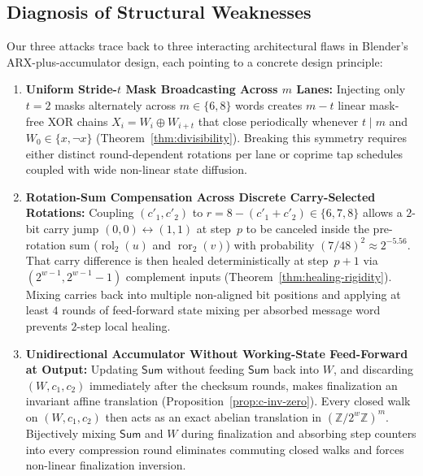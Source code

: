 \documentclass[11pt,a4paper]{article}
\theoremstyle{definition}
\theoremstyle{remark}
\newcommand{\Zmod}[1]{\mathbb{Z}/2^{#1}\mathbb{Z}}
\newcommand{\ror}{\operatorname{ror}}
\newcommand{\rol}{\operatorname{rol}}
\newcommand{\SumAcc}{\mathsf{Sum}}
\begin{document}
\subsection{Diagnosis of Structural Weaknesses}
\label{subsec:diagnosis}
Our three attacks trace back to three interacting architectural flaws in Blender's ARX-plus-accumulator design, each pointing to a concrete design principle:
\begin{enumerate}[leftmargin=2em]
    \item \textbf{Uniform Stride-$t$ Mask Broadcasting Across $m$ Lanes:} Injecting only $t = 2$ masks alternately across $m \in \{6, 8\}$ words creates $m - t$ linear mask-free XOR chains $X_i = W_i \oplus W_{i+t}$ that close periodically whenever $t \mid m$ and $W_0 \in \{x, \neg x\}$ (Theorem~\ref{thm:divisibility}). Breaking this symmetry requires either distinct round-dependent rotations per lane or coprime tap schedules coupled with wide non-linear state diffusion.
    \item \textbf{Rotation-Sum Compensation Across Discrete Carry-Selected Rotations:} Coupling $(c'_1, c'_2)$ to $r = 8 - (c'_1 + c'_2) \in \{6, 7, 8\}$ allows a $2$-bit carry jump $(0,0) \leftrightarrow (1,1)$ at step~$p$ to be canceled inside the pre-rotation sum ($\rol_2(u)$ and $\ror_2(v)$) with probability $(7/48)^2 \approx 2^{-5.56}$. That carry difference is then healed deterministically at step~$p+1$ via $(2^{w-1}, 2^{w-1} - 1)$ complement inputs (Theorem~\ref{thm:healing-rigidity}). Mixing carries back into multiple non-aligned bit positions and applying at least $4$ rounds of feed-forward state mixing per absorbed message word prevents $2$-step local healing.
    \item \textbf{Unidirectional Accumulator Without Working-State Feed-Forward at Output:} Updating $\SumAcc$ without feeding $\SumAcc$ back into $W$, and discarding $(W, c_1, c_2)$ immediately after the checksum rounds, makes finalization an invariant affine translation (Proposition~\ref{prop:c-inv-zero}). Every closed walk on $(W, c_1, c_2)$ then acts as an exact abelian translation in $(\Zmod{w})^m$. Bijectively mixing $\SumAcc$ and $W$ during finalization and absorbing step counters into every compression round eliminates commuting closed walks and forces non-linear finalization inversion.
\end{enumerate}
\end{document}

